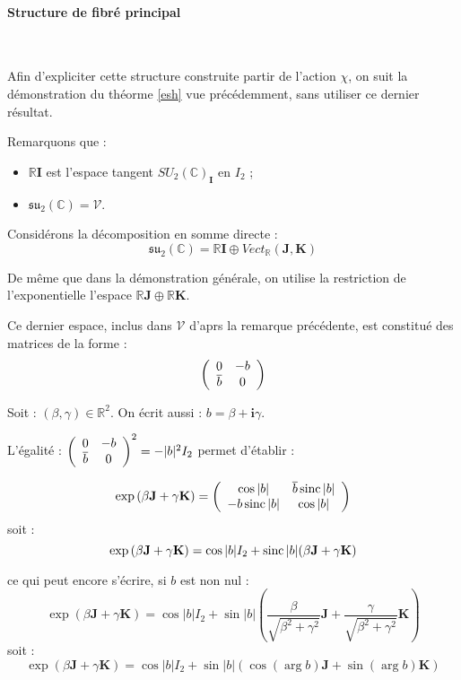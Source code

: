 \etoile
\paragraph{Structure de fibr\'e principal}~\\

\par
Afin d'expliciter cette structure construite  partir de l'action $\chi$, %
on suit la d\'emonstration du th\'eorme \ref{esh} vue pr\'ec\'edemment, sans utiliser ce dernier r\'esultat.

\par
Remarquons que :
\begin{itemize}
\item $\mathbb{R}\mathbf{I}$ est l'espace tangent  $SU_2(\mathbb{C})_{\mathbf{I}}$ en $I_2$ ;
\item $\mathfrak{su}_2(\mathbb{C})=\mathcal{V}$.
\end{itemize}

\par
Consid\'erons la d\'ecomposition en somme directe :
\[\mathfrak{su}_2(\mathbb{C})=\mathbb{R}\mathbf{I}\oplus Vect_{\mathbb{R}}(\mathbf{J},\mathbf{K})\]

\par
De m\^eme que dans la d\'emonstration g\'en\'erale, on utilise la restriction de l'exponentielle  l'espace $\mathbb{R}\mathbf{J}\oplus\mathbb{R}\mathbf{K}$.

\par
Ce dernier espace, inclus dans $\mathcal{V}$ d'aprs la remarque pr\'ec\'edente, est constitu\'e des matrices de la forme :
\[\left(\begin{array}{cc}0&-b\\\overline{b}&0\end{array}\right)\]

Soit : $(\beta,\gamma)\in\mathbb{R}^2$. On \'ecrit aussi : $b=\beta+\mathbf{i}\gamma$.

\par
L'\'egalit\'e : $\left(\begin{array}{cc}0&-b\\\overline{b}&0\end{array}\right)^2=-|b|^2I_2$ permet d'\'etablir :

\begin{equation}
\exp\left(\beta\mathbf{J}+\gamma\mathbf{K}\right)=\left(\begin{array}{cc}\cos |b|&\overline{b}\operatorname{sinc} |b|\\-b\operatorname{sinc} |b|&\cos|b|\end{array}\right)
\end{equation}
soit :
\begin{equation}
\exp\left(\beta\mathbf{J}+\gamma\mathbf{K}\right)=\cos |b|I_2+\operatorname{sinc} |b|(\beta\mathbf{J}+\gamma\mathbf{K})
\end{equation}

ce qui peut encore s'\'ecrire, si $b$ est non nul :
\[\exp\left(\beta\mathbf{J}+\gamma\mathbf{K}\right)=\cos |b|I_2+\sin|b|\left(\frac{\beta}{\sqrt{\beta^2+\gamma^2}}\mathbf{J}+\frac{\gamma}{\sqrt{\beta^2+\gamma^2}}\mathbf{K}\right)\]
soit :
\[\exp\left(\beta\mathbf{J}+\gamma\mathbf{K}\right)=\cos |b|I_2+\sin|b|\left(\cos\left(\arg b\right)\mathbf{J}+\sin\left(\arg b\right)\mathbf{K}\right)\]

